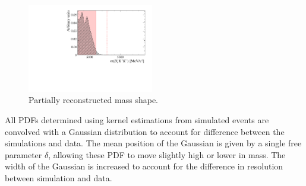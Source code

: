\begin{figure}[!h]
    \centering
    \includegraphics[width=0.49\textwidth]{figs/B2DsKK/Bs2DsstDs_4800_5900_Shape.pdf}
    \caption{Partially reconstructed \decay{\Bsb}{\Dssp\Dsm} mass shape.}
    \label{fig:B2DsKK_part_reco_backgrounds_DssDs}   
\end{figure}


All PDFs determined using kernel estimations from simulated events are convolved with a Gaussian distribution to account for difference between the simulations and data. The mean position of the Gaussian is given by a single free parameter $\delta$, allowing these PDF to move slightly high or lower in mass. The width of the Gaussian is increased to account for the difference in resolution between simulation and data.



